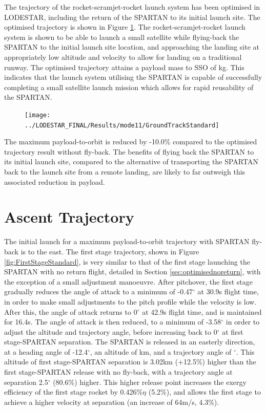 The trajectory of the rocket-scramjet-rocket launch system has been optimised in LODESTAR, including the return of the SPARTAN to its initial launch site. The optimised trajectory is shown in Figure \ref{fig:GroundTrackStandard}. 
The rocket-scramjet-rocket launch system is shown to be able to launch a small satellite 
while flying-back the SPARTAN to the initial launch site location, and approaching the landing site at appropriately low altitude and velocity to allow for landing on a traditional runway. 
The optimised trajectory attains a payload mass to SSO of \PayloadToOrbitStandard kg. 
This indicates that the launch system utilising the SPARTAN is capable of successfully completing a small satellite launch mission which allows for rapid reusability of the SPARTAN. 
\begin{figure}[ht!]
	\centering
	\texttt{[image: ../LODESTAR\_FINAL/Results/mode11/GroundTrackStandard]}
	\caption{}
	\label{fig:GroundTrackStandard}
\end{figure}
The maximum payload-to-orbit is reduced by -10.0\% compared to the optimised trajectory result without fly-back. The benefits of flying back the SPARTAN to its initial launch site, compared to the alternative of transporting the SPARTAN back to the launch site from a remote landing, are likely to far outweigh this associated reduction in payload. 



\section{Ascent Trajectory}

 The initial launch for a maximum payload-to-orbit trajectory with SPARTAN fly-back is to the east.
 The first stage trajectory, shown in Figure \ref{fig:FirstStageStandard}, is very similar to that of the first stage launching the SPARTAN with no return flight, detailed in Section \ref{sec:optimisednoreturn}, with the exception of a small adjustment manoeuvre. 
 After pitchover, the first stage gradually reduces the angle of attack to a minimum of -0.47$^\circ$ at 30.9s flight time, in order to make small adjustments to the pitch profile while the velocity is low. After this, the angle of attack returns to 0$^\circ$ at 42.9s flight time, and is maintained for 16.4s.
 The angle of attack is then reduced, to a minimum of -3.58$^\circ$ in order to adjust the altitude and trajectory angle, before increasing back to 0$^\circ$ at first stage-SPARTAN separation. 
 The SPARTAN is released in an easterly direction, at a heading angle of -12.4$^\circ$, an altitude of \firstsecondSeparationAltStandard km, and a trajectory angle of \firstsecondSeparationgammaStandard $^\circ$. 
 This altitude of first stage-SPARTAN separation is 3.02km (+12.5\%) higher than the first stage-SPARTAN release with no fly-back, with a trajectory angle at separation 2.5$^\circ$ (80.6\%) higher. 
 This higher release point increases the exergy efficiency of the first stage rocket by 0.426\%$\eta$ (5.2\%), and allows the first stage to achieve a higher velocity at separation (an increase of 64m/s, 4.3\%). 
 
